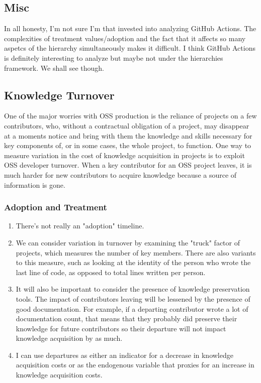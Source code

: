 \documentclass[source/paper/main.tex]{subfiles}
\begin{document}
\subsection{Misc}
In all honesty, I'm not sure I'm that invested into analyzing GitHub Actions. The complexities of treatment values/adoption and the fact that it affects so many aspetcs of the hierarchy simultaneously makes it difficult. I think GitHub Actions is definitely interesting to analyze but maybe not under the hierarchies framework. We shall see though.
\subsection{Knowledge Turnover}
One of the major worries with OSS production is the reliance of projects on a few contributors, who, without a contractual obligation of a project, may disappear at a moments notice and bring with them the knowledge and skills necessary for key components of, or in some cases, the whole project, to function. One way to measure variation in the cost of knowledge acquisition in projects is to exploit OSS developer turnover. When a key contributor for an OSS project leaves, it is much harder for new contributors to acquire knowledge because a source of information is gone. 
\subsubsection{Adoption and Treatment}
\begin{enumerate}
    \item There's not really an "adoption" timeline. 
    \item We can consider variation in turnover by examining the "truck" factor of projects, which measures the number of key members. There are also variants to this measure, such as looking at the identity of the person who wrote the last line of code, as opposed to total lines written per person. 
    \item It will also be important to consider the presence of knowledge preservation tools. The impact of contributors leaving will be lessened by the presence of good documentation. For example, if a departing contributor wrote a lot of documentation count, that means that they probably did preserve their knowledge for future contributors so their departure will not impact knowledge acquisition by as much. 
    \item I can use departures as either an indicator for a decrease in knowledge acquisition costs or as the endogenous variable that proxies for an increase in knowledge acquisition costs. 
\end{enumerate}
\end{document}
